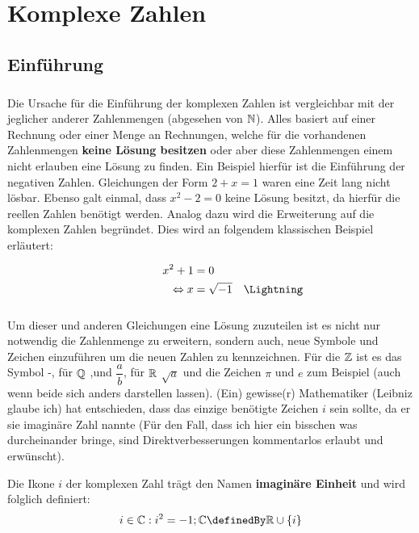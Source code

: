 \documentclass[main.tex]{subfiles}
\begin{document}
\chapter{Komplexe Zahlen}


\section{Einführung}

	\paragraph{} Die Ursache für die Einführung der komplexen Zahlen ist vergleichbar mit der jeglicher anderer Zahlenmengen (abgesehen
	von $\mathbb{N}$). Alles basiert auf einer Rechnung oder einer Menge an Rechnungen, welche für die vorhandenen Zahlenmengen \textbf{keine Lösung besitzen} oder aber diese Zahlenmengen einem nicht erlauben eine Lösung zu finden. Ein Beispiel hierfür ist die Einführung der
	negativen Zahlen. Gleichungen der Form $2 + x = 1$ waren eine Zeit lang nicht lösbar. Ebenso galt einmal, dass $x^2 - 2 = 0$ keine
	Lösung besitzt, da hierfür die reellen Zahlen benötigt werden. Analog dazu wird die Erweiterung auf die komplexen Zahlen begründet.
	Dies wird an folgendem klassischen Beispiel erläutert:

	\begin{align*}
		\qquad \qquad x^2 + 1 &= 0 \\
			\Leftrightarrow x &= \sqrt{-1} \quad \text{\Lightning}
	\end{align*}

	\paragraph{} Um dieser und anderen Gleichungen eine Lösung zuzuteilen ist es nicht nur notwendig die Zahlenmenge zu erweitern, sondern
	auch, neue Symbole und Zeichen einzuführen um die neuen Zahlen zu kennzeichnen. Für die $\mathbb{Z}$ ist es das Symbol \dq-\dq, für $\mathbb{Q}$
	\dq,\dq und $\dfrac{a}{b}$, für $\mathbb{R}$ $\sqrt{a}$ und die Zeichen $\pi$ und $e$ zum Beispiel (auch wenn beide sich anders darstellen lassen). (Ein) gewisse(r) Mathematiker (Leibniz glaube ich) hat entschieden, dass das einzige benötigte Zeichen $i$ sein sollte, da er sie imaginäre Zahl nannte (Für den Fall, dass ich hier ein bisschen was durcheinander bringe, sind Direktverbesserungen kommentarlos erlaubt und erwünscht).

	\begin{Definition}
		Die Ikone $i$ der komplexen Zahl trägt den Namen \textbf{imaginäre Einheit} und wird folglich definiert:
						$$i \in \C : i^2 = -1; \C \definedBy \R \cup \left\{i\right\}$$

	\end{Definition}
\end{document}
